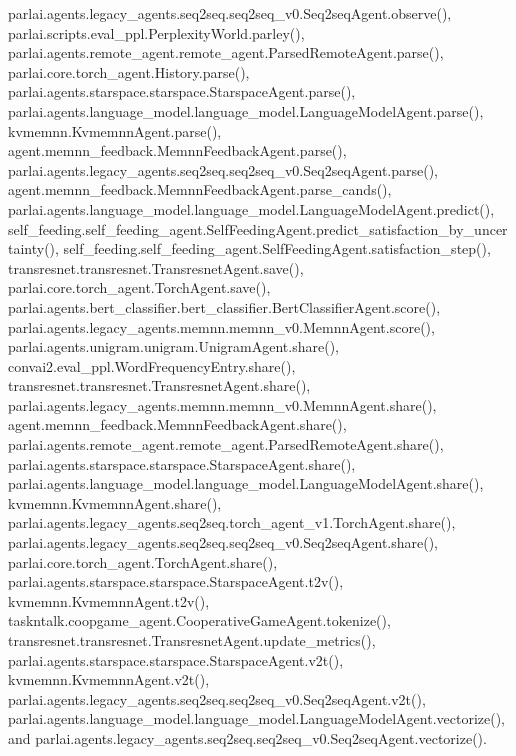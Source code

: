 parlai.\+agents.\+legacy\+\_\+agents.\+seq2seq.\+seq2seq\+\_\+v0.\+Seq2seq\+Agent.\+observe(), parlai.\+scripts.\+eval\+\_\+ppl.\+Perplexity\+World.\+parley(), parlai.\+agents.\+remote\+\_\+agent.\+remote\+\_\+agent.\+Parsed\+Remote\+Agent.\+parse(), parlai.\+core.\+torch\+\_\+agent.\+History.\+parse(), parlai.\+agents.\+starspace.\+starspace.\+Starspace\+Agent.\+parse(), parlai.\+agents.\+language\+\_\+model.\+language\+\_\+model.\+Language\+Model\+Agent.\+parse(), kvmemnn.\+Kvmemnn\+Agent.\+parse(), agent.\+memnn\+\_\+feedback.\+Memnn\+Feedback\+Agent.\+parse(), parlai.\+agents.\+legacy\+\_\+agents.\+seq2seq.\+seq2seq\+\_\+v0.\+Seq2seq\+Agent.\+parse(), agent.\+memnn\+\_\+feedback.\+Memnn\+Feedback\+Agent.\+parse\+\_\+cands(), parlai.\+agents.\+language\+\_\+model.\+language\+\_\+model.\+Language\+Model\+Agent.\+predict(), self\+\_\+feeding.\+self\+\_\+feeding\+\_\+agent.\+Self\+Feeding\+Agent.\+predict\+\_\+satisfaction\+\_\+by\+\_\+uncertainty(), self\+\_\+feeding.\+self\+\_\+feeding\+\_\+agent.\+Self\+Feeding\+Agent.\+satisfaction\+\_\+step(), transresnet.\+transresnet.\+Transresnet\+Agent.\+save(), parlai.\+core.\+torch\+\_\+agent.\+Torch\+Agent.\+save(), parlai.\+agents.\+bert\+\_\+classifier.\+bert\+\_\+classifier.\+Bert\+Classifier\+Agent.\+score(), parlai.\+agents.\+legacy\+\_\+agents.\+memnn.\+memnn\+\_\+v0.\+Memnn\+Agent.\+score(), parlai.\+agents.\+unigram.\+unigram.\+Unigram\+Agent.\+share(), convai2.\+eval\+\_\+ppl.\+Word\+Frequency\+Entry.\+share(), transresnet.\+transresnet.\+Transresnet\+Agent.\+share(), parlai.\+agents.\+legacy\+\_\+agents.\+memnn.\+memnn\+\_\+v0.\+Memnn\+Agent.\+share(), agent.\+memnn\+\_\+feedback.\+Memnn\+Feedback\+Agent.\+share(), parlai.\+agents.\+remote\+\_\+agent.\+remote\+\_\+agent.\+Parsed\+Remote\+Agent.\+share(), parlai.\+agents.\+starspace.\+starspace.\+Starspace\+Agent.\+share(), parlai.\+agents.\+language\+\_\+model.\+language\+\_\+model.\+Language\+Model\+Agent.\+share(), kvmemnn.\+Kvmemnn\+Agent.\+share(), parlai.\+agents.\+legacy\+\_\+agents.\+seq2seq.\+torch\+\_\+agent\+\_\+v1.\+Torch\+Agent.\+share(), parlai.\+agents.\+legacy\+\_\+agents.\+seq2seq.\+seq2seq\+\_\+v0.\+Seq2seq\+Agent.\+share(), parlai.\+core.\+torch\+\_\+agent.\+Torch\+Agent.\+share(), parlai.\+agents.\+starspace.\+starspace.\+Starspace\+Agent.\+t2v(), kvmemnn.\+Kvmemnn\+Agent.\+t2v(), taskntalk.\+coopgame\+\_\+agent.\+Cooperative\+Game\+Agent.\+tokenize(), transresnet.\+transresnet.\+Transresnet\+Agent.\+update\+\_\+metrics(), parlai.\+agents.\+starspace.\+starspace.\+Starspace\+Agent.\+v2t(), kvmemnn.\+Kvmemnn\+Agent.\+v2t(), parlai.\+agents.\+legacy\+\_\+agents.\+seq2seq.\+seq2seq\+\_\+v0.\+Seq2seq\+Agent.\+v2t(), parlai.\+agents.\+language\+\_\+model.\+language\+\_\+model.\+Language\+Model\+Agent.\+vectorize(), and parlai.\+agents.\+legacy\+\_\+agents.\+seq2seq.\+seq2seq\+\_\+v0.\+Seq2seq\+Agent.\+vectorize().

